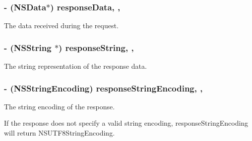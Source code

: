 \subsubsection[{response\+Data}]{\setlength{\rightskip}{0pt plus 5cm}-\/ (N\+S\+Data$\ast$) response\+Data\hspace{0.3cm}{\ttfamily [read]}, {\ttfamily [nonatomic]}, {\ttfamily [strong]}}\label{interface_a_f_u_r_l_connection_operation_aee9d9fd0cd4ff4cea1dd9f564ea487ef}
The data received during the request. \hypertarget{interface_a_f_u_r_l_connection_operation_a152e08b127469e9528f48ff18cb8f383}{}
\subsubsection[{response\+String}]{\setlength{\rightskip}{0pt plus 5cm}-\/ (N\+S\+String $\ast$) response\+String\hspace{0.3cm}{\ttfamily [read]}, {\ttfamily [nonatomic]}, {\ttfamily [copy]}}\label{interface_a_f_u_r_l_connection_operation_a152e08b127469e9528f48ff18cb8f383}
The string representation of the response data. \hypertarget{interface_a_f_u_r_l_connection_operation_a341868219e52e8f1a2a39f012ee6d6a4}{}
\subsubsection[{response\+String\+Encoding}]{\setlength{\rightskip}{0pt plus 5cm}-\/ (N\+S\+String\+Encoding) response\+String\+Encoding\hspace{0.3cm}{\ttfamily [read]}, {\ttfamily [nonatomic]}, {\ttfamily [assign]}}\label{interface_a_f_u_r_l_connection_operation_a341868219e52e8f1a2a39f012ee6d6a4}
The string encoding of the response.

If the response does not specify a valid string encoding, {\ttfamily response\+String\+Encoding} will return {\ttfamily N\+S\+U\+T\+F8\+String\+Encoding}. \hypertarget{interface_a_f_u_r_l_connection_operation_ac8a33d7fdd6314e92600318a79d60193}{}
